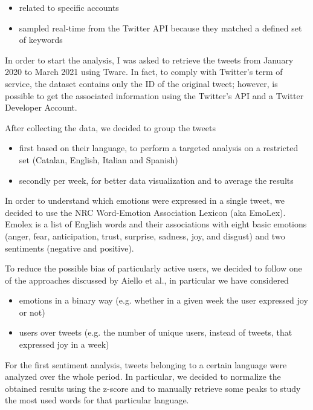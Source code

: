 \begin{itemize}
	\item related to specific accounts
	\item sampled real-time from the Twitter API because they matched a defined set of keywords
\end{itemize}

In order to start the analysis, I was asked to retrieve the tweets from January 2020 to March 2021 using Twarc. In fact, to comply with Twitter's term of service, the dataset contains only the ID of the original tweet; however, is possible to get the associated information using the Twitter's API and a Twitter Developer Account.

After collecting the data, we decided to group the tweets 

\begin{itemize}
	\item first based on their language, to perform a targeted analysis on a restricted set (Catalan, English, Italian and Spanish)
	\item secondly per week, for better data visualization and to average the results
\end{itemize}

In order to understand which emotions were expressed in a single tweet, we decided to use the NRC Word-Emotion Association Lexicon (aka EmoLex). Emolex is a list of English words and their associations with eight basic emotions (anger, fear, anticipation, trust, surprise, sadness, joy, and disgust) and two sentiments (negative and positive).

To reduce the possible bias of particularly active users, we decided to follow one of the approaches discussed by Aiello et al., in particular we have considered
	
\begin{itemize}
	\item emotions in a binary way (e.g. whether in a given week the user expressed joy or not)
	\item users over tweets (e.g. the number of unique users, instead of tweets, that expressed joy in a week)
\end{itemize}


For the first sentiment analysis, tweets belonging to a certain language were analyzed over the whole period. In particular, we decided to normalize the obtained results using the z-score and to manually retrieve some peaks to study the most used words for that particular language.

